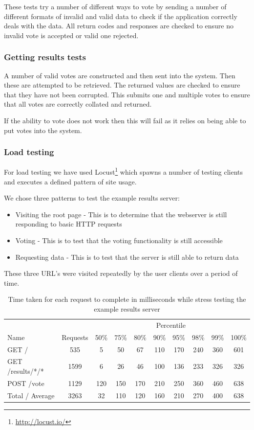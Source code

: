 These tests try a number of different ways to vote by sending a number of different formats of invalid and valid data to check if the application correctly deals with the data. All return codes and responses are checked to ensure no invalid vote is accepted or valid one rejected.

\subsubsection{Getting results tests}

A number of valid votes are constructed and then sent into the system. Then these are attempted to be retrieved. The returned values are checked to ensure that they have not been corrupted. This submits one and multiple votes to ensure that all votes are correctly collated and returned.

If the ability to vote does not work then this will fail as it relies on being able to put votes into the system.

\subsubsection{Load testing}

For load testing we have used Locust\footnote{\url{http://locust.io/}} which spawns a number of testing clients and executes a defined pattern of site usage.

We chose three patterns to test the example results server:

\begin{itemize}
\item Visiting the root page - This is to determine that the webserver is still responding to basic HTTP requests
\item Voting - This is to test that the voting functionality is still accessible
\item Requesting data - This is to test that the server is still able to return data
\end{itemize}

These three URL's were visited repeatedly by the user clients over a period of time.

\begin{table}
\caption{Time taken for each request to complete in milliseconds while stress testing the example results server}
\begin{tabular}{l c  c c c c c c c c }
\hline 
& & \multicolumn{8}{c}{Percentile} \\
Name & Requests & 50\% & 75\% & 80\% & 90\% & 95\% & 98\% & 99\% & 100\% \\ 
\hline 
GET / & 535 & 5 & 50 & 67 & 110 & 170 & 240 & 360 & 601 \\ 
\hline 
GET /results/*/* & 1599 & 6 & 26 & 46 & 100 & 136 & 233 & 326 & 326 \\ 
\hline 
POST /vote & 1129 & 120 & 150 & 170 & 210 & 250 & 360 & 460 & 638 \\ 
\hline 
Total / Average & 3263 & 32 & 110 & 120 & 160 & 210 & 270 & 400 & 638 \\ 
\hline 
\end{tabular}
\label{Table:stress_testing_results_server}
\end{table}


